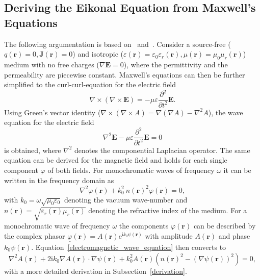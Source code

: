 \subsection{Deriving the Eikonal Equation from Maxwell's Equations}
The following argumentation is based on~\parencite{born_geometrische_1933} and~\parencite{sommerfeld_anwendung_1911}.
Consider a source-free (\(q(\bm{r}) = 0, \bm{J}(\bm{r}) = 0\)) and isotropic (\(\varepsilon(\bm{r}) = \varepsilon_0 \varepsilon_r(\bm{r}), \mu(\bm{r}) = \mu_0 \mu_r(\bm{r}) \)) medium with no free charges (\(\nabla \bm{E} = 0\)), where the permittivity and the permeability are piecewise constant.
Maxwell's equations can then be further simplified to the curl-curl-equation for the electric field
\begin{equation}
    \nabla \times (\nabla \times \bm{E}) = -\mu \varepsilon \frac{\partial^2}{\partial t^2} \bm{E}.
\end{equation}
Using Green's vector identity (\(\nabla \times (\nabla \times A) = \nabla(\nabla A) - \nabla^2 A\)), the wave equation for the electric field
\begin{equation}
    \nabla^2 \bm{E} - \mu \varepsilon \frac{\partial^2}{\partial t^2} \bm{E} = 0
\end{equation}
is obtained, where \(\nabla^2\) denotes the componential Laplacian operator.
The same equation can be derived for the magnetic field and holds for each single component \(\varphi \) of both fields.
For monochromatic waves of frequency \(\omega \) it can be written in the frequency domain as
\begin{equation}\label{electromagnetic_wave_equation}
    \nabla^2 \varphi(\bm{r}) + k_0^2\ n{(\bm{r})}^2 \varphi(\bm{r}) = 0,
\end{equation}
with \(k_0 = \omega \sqrt{\mu_0 \varepsilon_0} \) denoting the vacuum wave-number and \(n(\bm{r}) = \sqrt{\varepsilon_r(\bm{r}) \mu_r(\bm{r})}\) denoting the refractive index of the medium.
For a monochromatic wave of frequency \(\omega \) the components \(\varphi(\bm{r})\) can be described by the complex phasor \(\underline{\varphi}(\bm{r}) = A(\bm{r}) \mathrm{e}^{\mathrm{i} k_0 \psi(\bm{r})}\) with amplitude \(A(\bm{r})\) and phase \(k_0 \psi(\bm{r})\).
Equation~\eqref{electromagnetic_wave_equation} then converts to 
\begin{equation}\label{electromagnetic_wave_equation_complex}
    \nabla^2 A(\bm{r}) + 2\mathrm{i}k_0 \nabla A(\bm{r}) \cdot \nabla \psi(\bm{r}) + k_0^2 A(\bm{r}) ({n(\bm{r})}^2 - {(\nabla \psi(\bm{r}))}^2) = 0,
\end{equation}
with a more detailed derivation in Subsection~\ref{derivation}.

